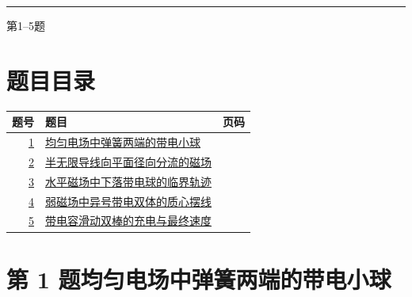 \documentclass[UTF8,fontset=fandol,a4paper,11pt]{ctexart}
\begin{document}

\thispagestyle{empty}\vspace*{22mm}

\par\vspace{12mm}

\par\vspace{12mm}

\par\vspace{9mm}

\noindent\textcolor{accent}{\rule{\linewidth}{1pt}}\par\vspace{9mm}

\noindent 第1--5题\par\vfill\clearpage

\section*{题目目录}

\begin{longtable}{@{}r p{113mm} r@{}}\toprule 题号 & 题目 & 页码\\\midrule

\hyperref[q:1]{1} & \hyperref[q:1]{均匀电场中弹簧两端的带电小球} & \pageref{q:1} \\

\hyperref[q:2]{2} & \hyperref[q:2]{半无限导线向平面径向分流的磁场} & \pageref{q:2} \\

\hyperref[q:3]{3} & \hyperref[q:3]{水平磁场中下落带电球的临界轨迹} & \pageref{q:3} \\

\hyperref[q:4]{4} & \hyperref[q:4]{弱磁场中异号带电双体的质心摆线} & \pageref{q:4} \\

\hyperref[q:5]{5} & \hyperref[q:5]{带电容滑动双棒的充电与最终速度} & \pageref{q:5} \\

\bottomrule\end{longtable}

\clearpage


\section*{第 1 题\quad 均匀电场中弹簧两端的带电小球}\label{q:1}
\end{document}

